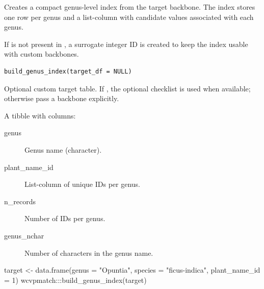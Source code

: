 \documentclass[a4paper]{book}
\begin{document}
%
\begin{Description}
\strong{[Stable]}

Creates a compact genus-level index from the target backbone. The index stores
one row per genus and a list-column with candidate  values
associated with each genus.

If  is not present in , a surrogate integer ID is
created to keep the index usable with custom backbones.
\end{Description}
%
\begin{Usage}
\begin{verbatim}
build_genus_index(target_df = NULL)
\end{verbatim}
\end{Usage}
%
\begin{Arguments}
\begin{ldescription}
\item[\code{target\_df}] Optional custom target table. If , the optional  checklist is used when available; otherwise pass a backbone explicitly.
\end{ldescription}
\end{Arguments}
%
\begin{Value}
A tibble with columns:
\begin{description}

\item[genus] Genus name (character).
\item[plant\_name\_id] List-column of unique IDs per genus.
\item[n\_records] Number of IDs per genus.
\item[genus\_nchar] Number of characters in the genus name.

\end{description}

\end{Value}
%
\begin{Examples}
\begin{ExampleCode}

target <- data.frame(genus = "Opuntia", species = "ficus-indica", plant_name_id = 1)
wcvpmatch:::build_genus_index(target)

\end{ExampleCode}
\end{Examples}
\end{document}
